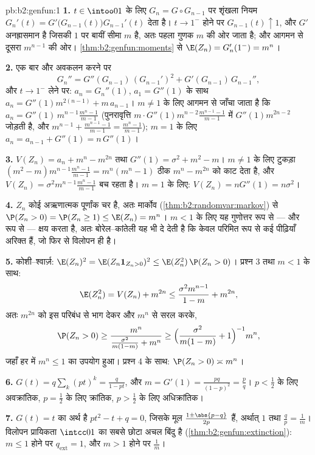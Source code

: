 \begin{solution}{pb:b2:genfun:1}
\textbf{1.} $t \in \intoo01$ के लिए $G_n = G
\circ G_{n-1}$ पर शृंखला नियम $G_n'(t) =
G'\bigl(G_{n-1}(t)\bigr)G_{n-1}'(t)$ देता है। $t \to 1^-$ होने पर
$G_{n-1}(t) \uparrow 1$, और $G'$ अनह्रासमान है जिसकी $1$ पर बायीं सीमा $m$ है, अतः पहला
गुणक $m$ की ओर जाता है; और आगमन से दूसरा $m^{n-1}$ की ओर। \cref{thm:b2:genfun:moments} से $\E(Z_n) = G_n'(1^-) = m^n$।

\textbf{2.} एक बार और अवकलन करने पर
\[
G_n'' = G''(G_{n-1})\,(G_{n-1}')^2 +
G'(G_{n-1})\,G_{n-1}'',
\]
और $t \to 1^-$ लेने पर: $a_n = G_n''(1)$, $a_1 = G''(1)$ के साथ $a_n = G''(1)m^{2(n-1)} + m\,
a_{n-1}$। $m \neq
1$ के लिए आगमन से जाँचा जाता
है कि $a_n = G''(1)\,m^{n-1}
\frac{m^n - 1}{m - 1}$ (पुनरावृत्ति $m\cdot G''(1)m^{n-2}\frac{m^{n-1}-1}{m-1}$ में $G''(1)m^{2n-2}$ जोड़ती है, और $m^{n-1} + \frac{m^{n-1}-1}{m-1} = \frac{m^n - 1}{m-1}$); $m = 1$ के लिए
$a_n = a_{n-1} + G''(1) = n\,G''(1)$।

\textbf{3.} $V(Z_n) = a_n + m^n - m^{2n}$ तथा $G''(1) =
\sigma^2 + m^2 - m$। $m \neq 1$ के लिए टुकड़ा $(m^2 -
m)m^{n-1}\frac{m^n-1}{m-1} = m^n(m^n - 1)$ ठीक $m^n -
m^{2n}$ को काट देता
है, और $V(Z_n) =
\sigma^2m^{n-1}\frac{m^n-1}{m-1}$ बच रहता है। $m = 1$ के लिए: $V(Z_n) =
nG''(1) = n\sigma^2$।

\textbf{4.} $Z_n$ कोई अऋणात्मक पूर्णांक चर है, अतः मार्कोव (\cref{thm:b2:randomvar:markov}) से
$\P(Z_n > 0) = \P(Z_n \geq 1) \leq \E(Z_n) = m^n$। $m < 1$ के लिए यह गुणोत्तर रूप से --- और  रूप से --- क्षय
करता है, अतः बोरेल--कांतेली यह भी दे देती है कि केवल परिमित रूप से
कई पीढ़ियाँ अरिक्त हैं, जो फिर से विलोपन ही है।

\textbf{5.} कोशी--श्वार्ज़: $\E(Z_n)^2 = \E(Z_n\mathbf
1_{Z_n>0})^2 \leq \E(Z_n^2)\,\P(Z_n > 0)$। प्रश्न 3 तथा $m < 1$ के साथ:
\[
\E(Z_n^2) = V(Z_n) + m^{2n}
\leq \frac{\sigma^2m^{n-1}}{1-m} + m^{2n},
\]
अतः $m^{2n}$ को इस परिबंध से भाग देकर और $m^n$ से सरल करके,
\[
\P(Z_n > 0) \geq \frac{m^n}{\frac{\sigma^2}{m(1-m)} + m^n}
\geq \Bigl(\frac{\sigma^2}{m(1-m)} + 1\Bigr)^{-1}m^n ,
\]
जहाँ हर में $m^n \leq 1$ का उपयोग हुआ। प्रश्न 4 के साथ: $\P(Z_n > 0) \asymp m^n$।

\textbf{6.} $G(t) = q\sum_k(pt)^k = \frac{q}{1 - pt}$, और $m
= G'(1) = \frac{pq}{(1-p)^2} = \frac pq$। $p
< \frac12$ के लिए अवक्रांतिक, $p = \frac12$ के लिए
क्रांतिक, $p
> \frac12$ के लिए अधिक्रांतिक।

\textbf{7.} $G(t) = t$ का अर्थ है $pt^2 - t + q = 0$, जिसके मूल $\frac{1 \pm \abs{p - q}}{2p}$ हैं, अर्थात् $1$
तथा $\frac qp =
\frac1m$। विलोपन प्रायिकता $\intcc01$ का सबसे छोटा अचल बिंदु है (\cref{thm:b2:genfun:extinction}): $m \leq 1$
होने पर $q_{\mathrm{ext}} = 1$, और $m >
1$ होने पर $\frac1m$।


\end{solution}
